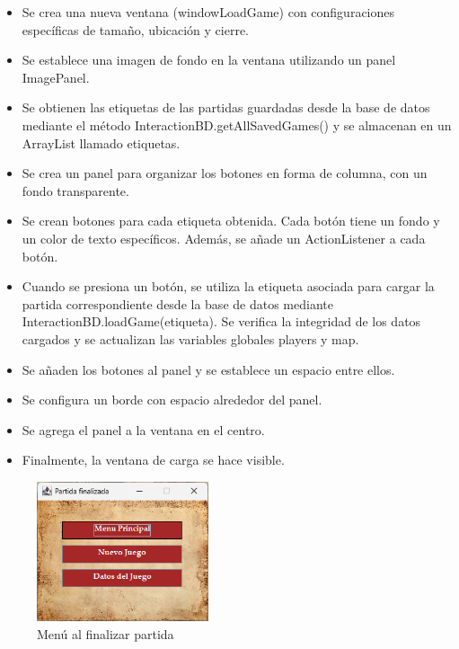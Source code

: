 \documentclass{article}
\begin{document}
    \begin{itemize}	
            \item Se crea una nueva ventana (windowLoadGame) con configuraciones específicas de tamaño, ubicación y cierre.
            \item Se establece una imagen de fondo en la ventana utilizando un panel ImagePanel.
            \item Se obtienen las etiquetas de las partidas guardadas desde la base de datos mediante el método InteractionBD.getAllSavedGames() y se almacenan en un ArrayList llamado etiquetas.
            \item Se crea un panel para organizar los botones en forma de columna, con un fondo transparente.
            \item Se crean botones para cada etiqueta obtenida. Cada botón tiene un fondo y un color de texto específicos. Además, se añade un ActionListener a cada botón.
            \item Cuando se presiona un botón, se utiliza la etiqueta asociada para cargar la partida correspondiente desde la base de datos mediante InteractionBD.loadGame(etiqueta). Se verifica la integridad de los datos cargados y se actualizan las variables globales players y map.
            \item Se añaden los botones al panel y se establece un espacio entre ellos.
            \item Se configura un borde con espacio alrededor del panel.
            \item Se agrega el panel a la ventana en el centro.
            \item Finalmente, la ventana de carga se hace visible.
	\end{itemize}

\newpage
     \begin{figure}[H]
        \centering
		\includegraphics[width=0.45\textwidth,keepaspectratio]{img/Menu_Fin_Partida.png}
        \caption{Menú al finalizar partida}
    \end{figure}
\end{document}
